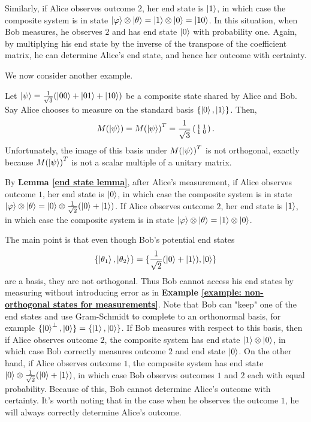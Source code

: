 \begin{example}
Similarly, if Alice observes outcome $2$, her end state is $\ket{1}$, in which case the composite system is in state $\ket{\varphi}\otimes\ket{\theta}=\ket{1}\otimes \ket{0}=\ket{10}$.  In this situation, when Bob measures, he observes $2$ and has end state $\ket{0}$ with probability one.  Again, by multiplying his end state by the inverse of the transpose of the coefficient matrix, he can determine Alice's end state, and hence her outcome with certainty.
\end{example}


We now consider another example.

\begin{example}
\label{example bad}
Let $\ket{\psi}=\frac{1}{\sqrt{3}}(\ket{00}+\ket{01}+\ket{10})$ be a composite state shared by Alice and Bob. Say Alice chooses to measure on the standard basis $\{\ket{0}, \ket{1}\}$. Then,
\begin{equation*}
M(\ket{\psi})={M(\ket{\psi})}^T=\frac{1}{\sqrt{3}}\left(\begin{smallmatrix}1 & 1\\1 & 0\end{smallmatrix}\right).
\end{equation*}
 Unfortunately, the image of this basis under ${M(\ket{\psi})}^T$ is not orthogonal, exactly because ${M(\ket{\psi})}^T$ is not a scalar multiple of a unitary matrix.
 
By \textbf{Lemma \ref{end state lemma}}, after Alice's measurement, if Alice observes outcome $1$, her end state is $\ket{0}$, in which case the composite system is in state $\ket{\varphi}\otimes \ket{\theta}=\ket{0}\otimes\frac{1}{\sqrt{2}}(\ket{0}+\ket{1})$.  If Alice observes outcome $2$, her end state is $\ket{1}$, in which case the composite system is in state $\ket{\varphi}\otimes \ket{\theta}=\ket{1}\otimes \ket{0}$.
 
 The main point is that even though Bob's potential end states
 \begin{equation*}
 \{\ket{\theta_1},\ket{\theta_2}\}=\{\frac{1}{\sqrt{2}}(\ket{0}+\ket{1}),\ket{0} \}
 \end{equation*}
 are a basis, they are not orthogonal.  Thus Bob cannot access his end states by measuring without introducing error as in {\bf{Example} \ref{example: non-orthogonal states for measurements}}.  Note that Bob can "keep" one of the end states and use Gram-Schmidt to complete to an orthonormal basis, for example $\{\ket{0}^\perp, \ket{0}\}=\{\ket{1},\ket{0}\}$.  If Bob measures with respect to this basis, then if Alice observes outcome $2$, the composite system has end state $\ket{1}\otimes \ket{0}$, in which case Bob correctly measures outcome $2$ and end state $\ket{0}$.  On the other hand, if Alice observes outcome $1$, the composite system has end state $\ket{0}\otimes\frac{1}{\sqrt{2}}(\ket{0}+\ket{1})$, in which case Bob observes outcomes $1$ and $2$ each with equal probability.  Because of this, Bob cannot determine Alice's outcome with certainty.  It's worth noting that in the case when he observes the outcome $1$, he will always correctly determine Alice's outcome.


\end{example}




